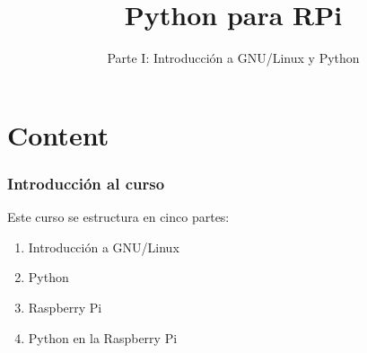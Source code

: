 \documentclass[colorlinks,10pt]{beamer}
\title{ Python para RPi}
\subtitle
 {Parte I:  Introducción a GNU/Linux y Python} %
\begin{document}
\begin{frame}[plain]
   \maketitle
\end{frame}


\section{Content}



\begin{frame}
  \frametitle{ Introducción al curso}
  Este curso se estructura en cinco partes: 
  \begin{enumerate}
  \item Introducción a GNU/Linux
  \item Python
  \item Raspberry Pi
  \item Python en la Raspberry Pi
  \end{enumerate}

\end{frame}
\end{document}
